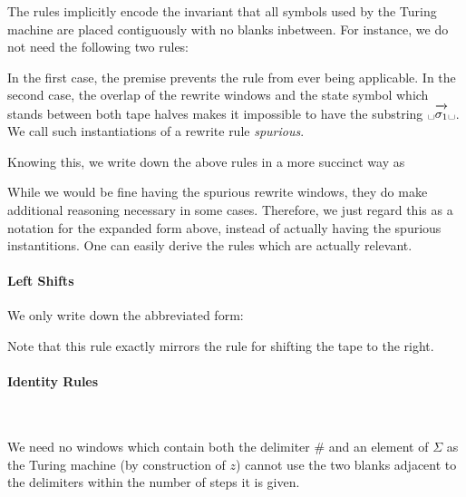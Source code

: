 The rules implicitly encode the invariant that all symbols used by the Turing machine are placed contiguously with no blanks inbetween. For instance, we do not need the following two rules:
\begin{center}
  \quad
\end{center}
In the first case, the premise prevents the rule from ever being applicable. In the second case, the overlap of the rewrite windows and the state symbol which stands between both tape halves makes it impossible to have the substring $\blank \polpos{\sigma_1} \blank$. 
We call such instantiations of a rewrite rule \emph{spurious}.

Knowing this, we write down the above rules in a more succinct way as 
\begin{center}
\end{center}
While we would be fine having the spurious rewrite windows, they do make additional reasoning necessary in some cases. Therefore, we just regard this as a notation for the expanded form above, instead of actually having the spurious instantitions. One can easily derive the rules which are actually relevant.

\paragraph{Left Shifts}
We only write down the abbreviated form:
\begin{center}
\end{center}
Note that this rule exactly mirrors the rule for shifting the tape to the right.

\paragraph{Identity Rules}
\begin{center}
  \\
  \trewwin{\#}{\blank}{\blank}{\#}{\blank}{\blank} 
  \quad \trewwin{\blank}{\blank}{\#}{\blank}{\blank}{\#}
\end{center}
We need no windows which contain both the delimiter $\#$ and an element of $\Sigma$ as the Turing machine (by construction of $z$) cannot use the two blanks adjacent to the delimiters within the number of steps it is given.

